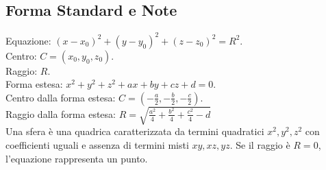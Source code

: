 \documentclass[a4paper,14pt]{article}
\begin{document}
\subsection{Forma Standard e Note}
Equazione: \((x-x_{0})^{2}+(y-y_{0})^{2}+(z-z_{0})^{2}=R^{2}\). \\
Centro: \(C=(x_{0},y_{0},z_{0})\). \\
Raggio: \(R\). \\
Forma estesa: \(x^{2}+y^{2}+z^{2}+ax+by+cz+d=0\). \\
Centro dalla forma estesa: \(C=\left(-\frac{a}{2},-\frac{b}{2},-\frac{c}{2}\right)\).\\
Raggio dalla forma estesa: \(R=\sqrt{\frac{a^{2}}{4}+\frac{b^{2}}{4}+\frac{c^{2}}{4}-d}\) \\
Una sfera è una quadrica caratterizzata da termini quadratici \(x^{2},y^{2},z^{2}\) con coefficienti uguali e assenza di termini misti \(xy,xz,yz\). Se il raggio è \(R=0\), l'equazione rappresenta un punto.
\end{document}
